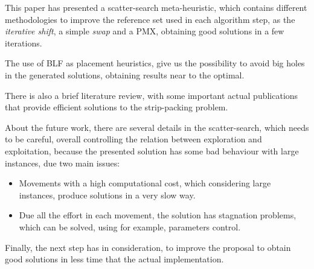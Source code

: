 This paper has presented a scatter-search meta-heuristic,
which contains different methodologies to improve
the reference set used in each algorithm step,
as the \emph{iterative shift}, a simple \emph{swap}
and a PMX,
obtaining good solutions in a few iterations.

The use of BLF as placement heuristics,
give us the possibility to avoid big holes in the generated
solutions, obtaining results near to the optimal.

There is also a brief literature review,
with some important actual publications
that provide efficient solutions to the
strip-packing problem.

About the future work,
there are several details in the scatter-search,
which needs to be careful, overall
controlling the relation between exploration
and exploitation, because the presented solution
has some bad behaviour with large instances,
due two main issues:

\begin{itemize}
    \item Movements with a high computational cost,
        which considering large instances, produce
        solutions in a very slow way.
    \item Due all the effort in each movement,
        the solution has stagnation problems,
        which can be solved, using for example,
        parameters control.
\end{itemize}

Finally,
the next step has in consideration,
to improve the proposal to obtain
good solutions in less time that the actual
implementation.
